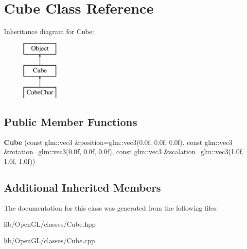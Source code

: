 \hypertarget{class_cube}{}\section{Cube Class Reference}
\label{class_cube}
Inheritance diagram for Cube\+:\begin{figure}[H]
\begin{center}
\leavevmode
\includegraphics[height=3.000000cm]{class_cube}
\end{center}
\end{figure}
\subsection*{Public Member Functions}
\begin{DoxyCompactItemize}
\item 
\mbox{\label{class_cube_a944189920558ba97a1a8a1e74f0403ec}} 
{\bfseries Cube} (const glm\+::vec3 \&position=glm\+::vec3(0.\+0f, 0.\+0f, 0.\+0f), const glm\+::vec3 \&rotation=glm\+::vec3(0.\+0f, 0.\+0f, 0.\+0f), const glm\+::vec3 \&scalation=glm\+::vec3(1.\+0f, 1.\+0f, 1.\+0f))
\end{DoxyCompactItemize}
\subsection*{Additional Inherited Members}


The documentation for this class was generated from the following files\+:\begin{DoxyCompactItemize}
\item 
lib/\+Open\+G\+L/classes/Cube.\+hpp\item 
lib/\+Open\+G\+L/classes/Cube.\+cpp\end{DoxyCompactItemize}
